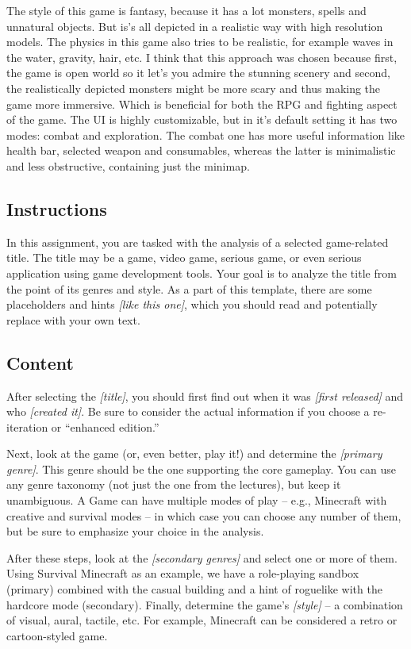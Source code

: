 \documentclass[a4paper,10pt,english]{article}
\newcommand{\ph}[1]{\textit{[#1]}}
\begin{document}
The style of this game is fantasy, because it has a lot monsters, spells and unnatural objects. But is's all depicted in a realistic way with high resolution models. The physics in this game also tries to be realistic, for example waves in the water, gravity, hair, etc. I think that this approach was chosen because first, the game is open world so it let's you admire the stunning scenery and second, the realistically depicted monsters might be more scary and thus making the game more immersive. Which is beneficial for both the RPG and fighting aspect of the game. The UI is highly customizable, but in it's default setting it has two modes: combat and exploration. The combat one has more useful information like health bar, selected weapon and consumables, whereas the latter is minimalistic and less obstructive, containing just the minimap.


\subsection*{Instructions}

In this assignment, you are tasked with the analysis of a selected game-related title. The title may be a game, video game, serious game, or even serious application using game development tools. Your goal is to analyze the title from the point of its genres and style. As a part of this template, there are some placeholders and hints \ph{like this one}, which you should read and potentially replace with your own text.

\subsection*{Content}

After selecting the \ph{title}, you should first find out when it was \ph{first released} and who \ph{created it}. Be sure to consider the actual information if you choose a re-iteration or ``enhanced edition.'' 

Next, look at the game (or, even better, play it!) and determine the \ph{primary genre}. This genre should be the one supporting the core gameplay. You can use any genre taxonomy (not just the one from the lectures), but keep it unambiguous. A Game can have multiple modes of play -- e.g., Minecraft with creative and survival modes -- in which case you can choose any number of them, but be sure to emphasize your choice in the analysis.

After these steps, look at the \ph{secondary genres} and select one or more of them. Using Survival Minecraft as an example, we have a role-playing sandbox (primary) combined with the casual building and a hint of roguelike with the hardcore mode (secondary). Finally, determine the game's \ph{style} -- a combination of visual, aural, tactile, etc. For example, Minecraft can be considered a retro or cartoon-styled game.
\end{document}
